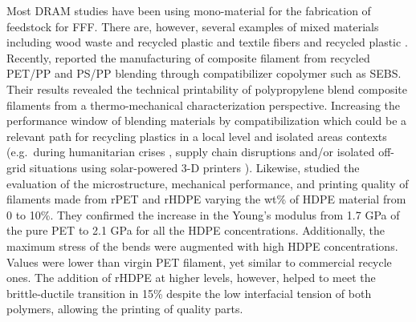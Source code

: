 \documentclass[
  12pt,
  number]{article}
\begin{document}
Most DRAM studies have been using mono-material for the fabrication of
feedstock for FFF. There are, however, several examples of mixed
materials including wood waste and recycled plastic
\citep{pringle2018, loschke2019} and textile fibers and recycled plastic
\citep{carrete2021}. Recently, \citep{zander2019b} reported the
manufacturing of composite filament from recycled PET/PP and PS/PP
blending through compatibilizer copolymer such as SEBS. Their results
revealed the technical printability of polypropylene blend composite
filaments from a thermo-mechanical characterization perspective.
Increasing the performance window of blending materials by
compatibilization which could be a relevant path for recycling plastics
in a local level and isolated areas contexts (e.g.~during humanitarian
crises \citep[\citep{corsini2022},\citep{lipsky2019}]{savonen2018},
supply chain disruptions \citep[\citep{choong202}, \citep{salmi2020},
\citep{attaran2020}]{novak2020} and/or isolated off-grid situations
using solar-powered 3-D printers \citep[\citep{gwamuri2016},
\citep{wong2015}, \citep{mohammed2018}]{king2014}). Likewise,
\citep{vaucher2022} studied the evaluation of the microstructure,
mechanical performance, and printing quality of filaments made from rPET
and rHDPE varying the wt\% of HDPE material from 0 to 10\%. They
confirmed the increase in the Young's modulus from 1.7 GPa of the pure
PET to 2.1 GPa for all the HDPE concentrations. Additionally, the
maximum stress of the bends were augmented with high HDPE
concentrations. Values were lower than virgin PET filament, yet similar
to commercial recycle ones. The addition of rHDPE at higher levels,
however, helped to meet the brittle-ductile transition in 15\% despite
the low interfacial tension of both polymers, allowing the printing of
quality parts.
\end{document}
